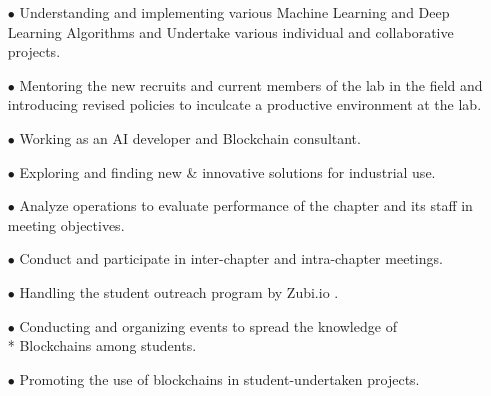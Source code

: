 \documentclass[10pt,a4paper,ragged2e]{altacv}
\begin{document}
\begin{itemize}
    \item [$\bullet$]Understanding and implementing various Machine Learning and Deep Learning Algorithms and Undertake various individual and collaborative projects.
    \item [$\bullet$]Mentoring the new recruits and current members of the lab in the field and introducing revised policies to inculcate a productive environment at the lab.
\end{itemize}
\begin{itemize}
    \item [$\bullet$]Working as an AI developer and Blockchain consultant.
    \item [$\bullet$]Exploring and finding new \& innovative solutions for industrial use.
\end{itemize}
\begin{itemize}
    \item [$\bullet$]Analyze operations to evaluate performance of the chapter and its staff in meeting objectives.
    \item [$\bullet$]Conduct and participate in inter-chapter and intra-chapter meetings.
\end{itemize}
\begin{itemize}
    \item [$\bullet$]Handling the student outreach program by Zubi.io .
    \item [$\bullet$]Conducting and organizing events to spread the knowledge of\\* Blockchains among students.
    \item [$\bullet$]Promoting the use of blockchains in student-undertaken projects.
\end{itemize}
\end{document}
